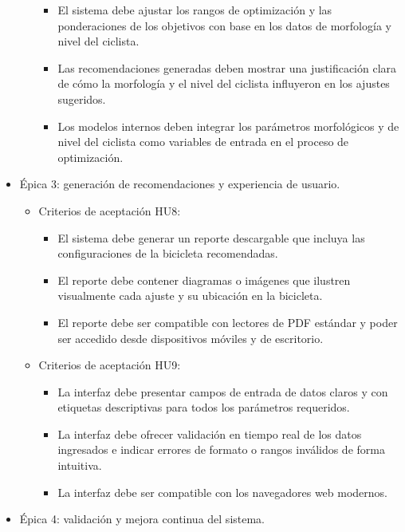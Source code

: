 \documentclass[
11pt, %
]{charter}
\begin{document}
\begin{itemize}
\begin{itemize}
        \begin{itemize}
          \item El sistema debe ajustar los rangos de optimización y las ponderaciones de los objetivos con base en los datos de morfología y nivel del ciclista.
          \item Las recomendaciones generadas deben mostrar una justificación clara de cómo la morfología y el nivel del ciclista influyeron en los ajustes sugeridos.
          \item Los modelos internos deben integrar los parámetros morfológicos y de nivel del ciclista como variables de entrada en el proceso de optimización.
        \end{itemize}
    \end{itemize}
  \item Épica 3: generación de recomendaciones y experiencia de usuario.
    \begin{itemize}
      \item Criterios de aceptación HU8:
        \begin{itemize}
          \item El sistema debe generar un reporte descargable que incluya las configuraciones de la bicicleta recomendadas.
          \item El reporte debe contener diagramas o imágenes que ilustren visualmente cada ajuste y su ubicación en la bicicleta.
          \item El reporte debe ser compatible con lectores de PDF estándar y poder ser accedido desde dispositivos móviles y de escritorio.
        \end{itemize}
      \item Criterios de aceptación HU9:
        \begin{itemize}
          \item La interfaz debe presentar campos de entrada de datos claros y con etiquetas descriptivas para todos los parámetros requeridos.
          \item La interfaz debe ofrecer validación en tiempo real de los datos ingresados e indicar errores de formato o rangos inválidos de forma intuitiva.
          \item La interfaz debe ser compatible con los navegadores web modernos.
        \end{itemize}
    \end{itemize}
  \item Épica 4: validación y mejora continua del sistema.
    \begin{itemize}

\end{itemize}
\end{itemize}
\end{document}
